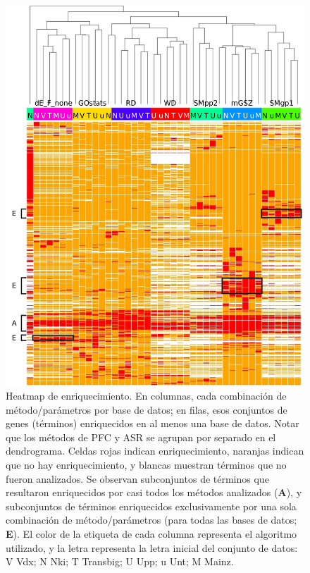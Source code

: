 \documentclass[12pt,twoside]{reedthesis}
\begin{document}
\begin{figure}

{\centering \includegraphics[width=0.9\linewidth]{images/IFA_FIG3} 

}

\caption{Heatmap de enriquecimiento. En columnas, cada combinación de método/parámetros por base de datos; en filas, esos conjuntos de genes (términos) enriquecidos en al menos una base de datos. Notar que los métodos de PFC y ASR se agrupan por separado en el dendrograma. Celdas rojas indican enriquecimiento, naranjas indican que no hay enriquecimiento, y blancas muestran términos que no fueron analizados. Se observan subconjuntos de términos que resultaron enriquecidos por casi todos los métodos analizados (\textbf{A}), y subconjuntos de términos enriquecidos exclusivamente por una sola combinación de método/parámetros (para todas las bases de datos; \textbf{E}). El color de la etiqueta de cada columna representa el algoritmo utilizado, y la letra representa la letra inicial del conjunto de datos: V Vdx; N Nki; T Transbig; U Upp; u Unt; M Mainz.}\label{fig:ifa3}
\end{figure}
\end{document}
